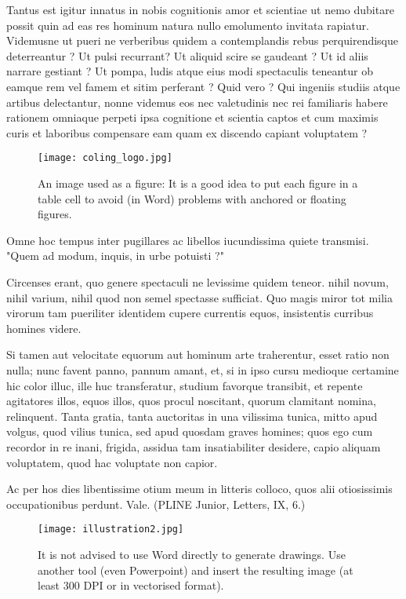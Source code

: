\documentclass[10pt,a5paper,twoside]{article}
\begin{document}
Tantus est igitur innatus in nobis cognitionis amor et scientiae ut nemo dubitare possit quin ad eas res hominum natura nullo emolumento invitata rapiatur. Videmusne ut pueri ne verberibus quidem a contemplandis rebus perquirendisque deterreantur ? Ut pulsi recurrant? Ut aliquid scire se gaudeant ? Ut id aliis narrare gestiant ? Ut pompa, ludis atque eius modi spectaculis teneantur ob eamque rem vel famem et sitim perferant ? Quid vero ? Qui ingeniis studiis atque artibus delectantur, nonne videmus eos nec valetudinis nec rei familiaris habere rationem omniaque perpeti ipsa cognitione et scientia captos et cum maximis curis et laboribus compensare eam quam ex discendo capiant voluptatem ?
\newpage
\begin{figure}[htbp] 
\begin{center}
\texttt{[image: coling\_logo.jpg]}
\caption{An image used as a figure: It is a good idea to put each figure in a table cell to avoid (in Word) problems with anchored or floating figures.}
\label{image} %
\end{center} 
\end{figure} %
Omne hoc tempus inter pugillares ac libellos iucundissima quiete transmisi. "Quem ad modum, inquis, in urbe potuisti ?"

Circenses erant, quo genere spectaculi ne levissime quidem teneor. nihil novum, nihil varium, nihil quod non semel spectasse sufficiat. Quo magis miror tot milia virorum tam pueriliter identidem cupere currentis equos, insistentis curribus homines videre.

Si tamen aut velocitate equorum aut hominum arte traherentur, esset ratio non nulla; nunc favent panno, pannum amant, et, si in ipso cursu medioque certamine hic color illuc, ille huc transferatur, studium favorque transibit, et repente agitatores illos, equos illos, quos procul noscitant, quorum clamitant nomina, relinquent. Tanta gratia, tanta auctoritas in una vilissima tunica, mitto apud volgus, quod vilius tunica, sed apud quosdam graves homines; quos ego cum recordor in re inani, frigida, assidua tam insatiabiliter desidere, capio aliquam voluptatem, quod hac voluptate non capior.

Ac per hos dies libentissime otium meum in litteris colloco, quos alii otiosissimis occupationibus perdunt. Vale. (PLINE Junior, Letters, IX, 6.) 
\begin{figure}[htbp]
\begin{center} 
\texttt{[image: illustration2.jpg]} 
\caption{It is not advised to use Word directly to generate drawings. Use another tool (even Powerpoint) and insert the resulting image (at least 300 DPI or in vectorised format).}
\label{figure}
\end{center}
\end{figure} 
\end{document}
